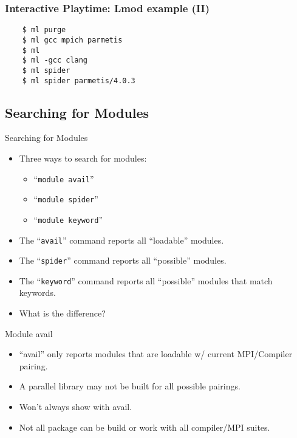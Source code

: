 \documentclass{beamer}
\begin{document}
\begin{frame}[fragile]
    \frametitle{Interactive Playtime: Lmod example (II)}
    {\small
\begin{verbatim}
    $ ml purge
    $ ml gcc mpich parmetis
    $ ml
    $ ml -gcc clang
    $ ml spider
    $ ml spider parmetis/4.0.3
\end{verbatim}
}
\end{frame}

\subsection{Searching for Modules}
\label{sec:search}


\begin{frame}{Searching for Modules}
  \begin{itemize}
    \item Three ways to search for modules:
      \begin{itemize}
        \item ``\texttt{module avail}''
        \item ``\texttt{module spider}''
        \item ``\texttt{module keyword}''
      \end{itemize}
    \item The ``\texttt{avail}''  command reports all ``loadable'' modules.
    \item The ``\texttt{spider}'' command reports all ``possible'' modules.
    \item The ``\texttt{keyword}'' command reports all ``possible''
      modules that match keywords.
    \item What is the difference?
  \end{itemize}
\end{frame}

\begin{frame}{Module avail}
  \begin{itemize}
    \item ``avail'' only reports modules that are loadable w/ current
      MPI/Compiler pairing.
    \item A parallel library may not be built for all possible pairings.
    \item Won't always show with avail.
    \item Not all package can be build or work with all compiler/MPI suites.
  \end{itemize}
\end{frame}
\end{document}
